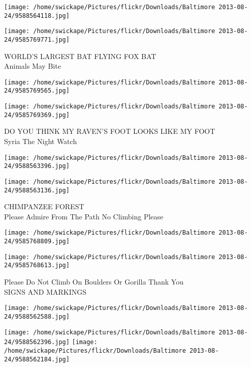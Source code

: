 \documentclass[10pt,letterpaper]{article}
\begin{document}
\texttt{[image: /home/swickape/Pictures/flickr/Downloads/Baltimore 2013-08-24/9588564118.jpg]}

\vspace{0.25in}
\texttt{[image: /home/swickape/Pictures/flickr/Downloads/Baltimore 2013-08-24/9585769771.jpg]}

WORLD'S LARGEST BAT FLYING FOX BAT\\
Animals May Bite\\
\pagebreak

\texttt{[image: /home/swickape/Pictures/flickr/Downloads/Baltimore 2013-08-24/9585769565.jpg]}

\vspace{0.25in}
\texttt{[image: /home/swickape/Pictures/flickr/Downloads/Baltimore 2013-08-24/9585769369.jpg]}

DO YOU THINK MY RAVEN'S FOOT LOOKS LIKE MY FOOT\\
Syria The Night Watch\\
\pagebreak

\texttt{[image: /home/swickape/Pictures/flickr/Downloads/Baltimore 2013-08-24/9588563396.jpg]}

\vspace{0.25in}
\texttt{[image: /home/swickape/Pictures/flickr/Downloads/Baltimore 2013-08-24/9588563136.jpg]}

CHIMPANZEE FOREST\\
Please Admire From The Path No Climbing Please\\
\pagebreak

\texttt{[image: /home/swickape/Pictures/flickr/Downloads/Baltimore 2013-08-24/9585768809.jpg]}

\vspace{0.25in}
\texttt{[image: /home/swickape/Pictures/flickr/Downloads/Baltimore 2013-08-24/9585768613.jpg]}

Please Do Not Climb On Boulders Or Gorilla Thank You\\
SIGNS AND MARKINGS\\
\pagebreak

\texttt{[image: /home/swickape/Pictures/flickr/Downloads/Baltimore 2013-08-24/9588562588.jpg]}

\vspace{0.25in}
\texttt{[image: /home/swickape/Pictures/flickr/Downloads/Baltimore 2013-08-24/9588562396.jpg]}
\texttt{[image: /home/swickape/Pictures/flickr/Downloads/Baltimore 2013-08-24/9588562184.jpg]}
\end{document}
